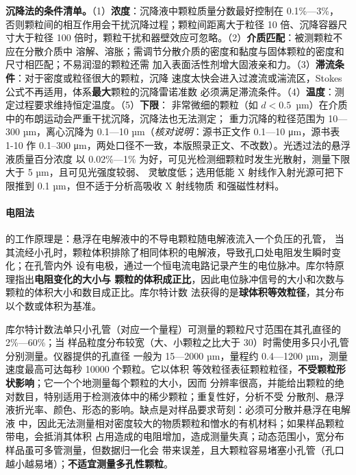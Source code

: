 \begin{measure}
\textbf{沉降法的条件清单。}（1）\textbf{浓度}：沉降液中颗粒质量分数最好控制在 0.1\%—3\%，
否则颗粒间的相互作用会干扰沉降过程；颗粒间距离大于粒径 10 倍、沉降容器尺寸大于粒径
100 倍时，颗粒干扰和器壁效应可忽略。（2）\textbf{介质匹配}：被测颗粒不应在分散介质中
溶解、溶胀；需调节分散介质的密度和黏度与固体颗粒的密度和尺寸相匹配；不易润湿的颗粒还需
加入表面活性剂增大固液亲和力。（3）\textbf{滞流条件}：对于密度或粒径很大的颗粒，沉降
速度太快会进入过渡流或湍流区，Stokes 公式不再适用，体系\textbf{最大}颗粒的沉降雷诺准数
必须满足滞流条件。（4）\textbf{温度}：测定过程要求维持恒定温度。（5）\textbf{下限}：
非常微细的颗粒（如 $d<0.5$~µm）在介质中的布朗运动会严重干扰沉降，沉降法也无法测定；
重力沉降的粒径范围为 10—300 µm，离心沉降为 0.1—10 µm（\emph{核对说明}：源书正文作 0.1—10 μm，源书表 1-10 作 0.1–300 μm，两处口径不一致，本版照录正文、不改数）。光透过法的悬浮液质量百分浓度
以 0.02\%—1\% 为好，可见光检测细颗粒时发生光散射，测量下限大于 5 µm，且可见光强度较弱、
灵敏度低；选用低能 X 射线作入射光源可把下限推到 0.1 µm，但不适于分析高吸收 X 射线物质
和强磁性材料。
\end{measure}

\paragraph{电阻法}的工作原理是：悬浮在电解液中的不导电颗粒随电解液流入一个负压的孔管，
当其流经小孔时，颗粒体积排除了相同体积的电解液，导致孔口处电阻发生瞬时变化；在孔管内外
设有电极，通过一个恒电流电路记录产生的电位脉冲。库尔特原理指出\textbf{电阻变化的大小与
颗粒的体积成正比}，因此电位脉冲信号的大小和次数与颗粒的体积大小和数目成正比。库尔特计数
法获得的是\textbf{球体积等效粒径}，其分布以个数或体积为基准。

库尔特计数法单只小孔管（对应一个量程）可测量的颗粒尺寸范围在其孔直径的 2\%—60\%；当
样品粒度分布较宽（大、小颗粒之比大于 30）时需使用多只小孔管分别测量。仪器提供的孔直径
一般为 15—2000 µm，量程约 0.4—1200 µm，测量速度最高可达每秒 10000 个颗粒。它以体积
等效粒径表征颗粒粒径，\textbf{不受颗粒形状影响}；它一个个地测量每个颗粒的大小，因而
分辨率很高，并能给出颗粒的绝对数目，特别适用于检测液体中的稀少颗粒；重复性好，分析不受
分散剂、悬浮液折光率、颜色、形态的影响。缺点是对样品要求苛刻：必须可分散并悬浮在电解液
中，因此无法测量相对密度较大的物质颗粒和憎水的有机材料；如果样品颗粒带电，会抵消其体积
占用造成的电阻增加，造成测量失真；动态范围小，宽分布样品虽可多管测量，但数据归一化会
带来误差，且大颗粒容易堵塞小孔管（孔口越小越易堵）；\textbf{不适宜测量多孔性颗粒}。

